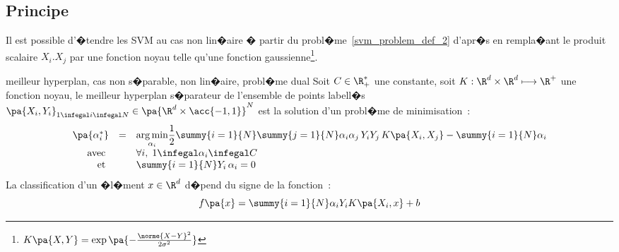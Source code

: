 \subsection{Principe}

Il est possible d'�tendre les SVM au cas non lin�aire � partir du probl�me~\ref{svm_problem_def_2} d'apr�s  en rempla�ant le produit scalaire $X_i . X_j$ par une fonction noyau telle qu'une fonction gaussienne\footnote{$K\pa{X,Y} = \exp\pa{ - \frac{ \norme{ X - Y }^2 }{2 \sigma^2}}$}.


            \begin{xproblem}{meilleur hyperplan, cas non s�parable, non lin�aire, probl�me dual}\label{svm_problem_def_3}
            Soit $C \in \R^*_+$ une constante, soit $K : \R^d \times \R^d \longmapsto \R^+$ une fonction noyau,
            le meilleur hyperplan s�parateur de l'ensemble de points labell�s
            $\pa{X_i,Y_i}_{1 \infegal i \infegal N} \in \pa{ \R^d \times \acc{-1,1} }^N$ est la solution
            d'un probl�me de minimisation~: 
                    $$
                    \begin{array}{rcl}    \pa{\alpha_i^*} &=& \underset{\alpha_i}{\arg \min} \dfrac{1}{2}  
                                                                                    \summy{i=1}{N}\summy{j=1}{N}
                                                                                            \alpha_i \alpha_j \,
                                                                                            Y_i Y_j \,
                                                                                            K\pa{X_i,X_j}
                                                                                    - \summy{i=1}{N} \alpha_i \\
                                         \text{avec }      && \forall i, \; 1 \infegal \alpha_i \infegal C \\
                                         \text{et }          && \summy{i=1}{N} Y_i \, \alpha_i = 0
                    \end{array}                                        
                    $$
            La classification d'un �l�ment $x \in \R^d$ d�pend du signe de la fonction~:
                    $$
                    f\pa{x} = \summy{i=1}{N} \alpha_i Y_i K\pa{X_i,x} + b
                    $$
            \end{xproblem}


